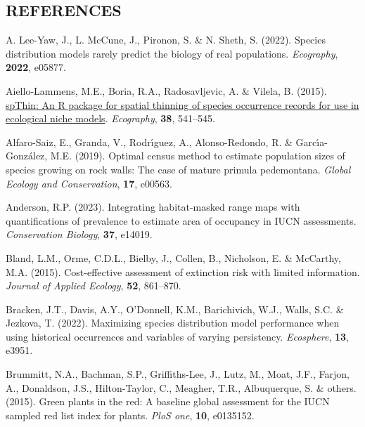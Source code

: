 \documentclass[
]{article}
\newlength{\cslhangindent}
\newlength{\cslentryspacingunit} %
\newenvironment{CSLReferences}[2] %
 {%
  \setlength{\parindent}{0pt}
  \ifodd #1
  \let\oldpar\par
  \def\par{\hangindent=\cslhangindent\oldpar}
  \fi
  \setlength{\parskip}{#2\cslentryspacingunit}
 }%
 {}
\begin{document}
\hypertarget{references}{%
\subsection*{REFERENCES}\label{references}}

\hypertarget{refs}{}
\begin{CSLReferences}{1}{0}
\leavevmode{}%
A. Lee-Yaw, J., L. McCune, J., Pironon, S. \& N. Sheth, S. (2022).
Species distribution models rarely predict the biology of real
populations. \emph{Ecography}, \textbf{2022}, e05877.

\leavevmode{}%
Aiello-Lammens, M.E., Boria, R.A., Radosavljevic, A. \& Vilela, B.
(2015).
\href{https://onlinelibrary.wiley.com/doi/10.1111/ecog.01132}{{spThin}:
An {R} package for spatial thinning of species occurrence records for
use in ecological niche models}. \emph{Ecography}, \textbf{38},
541--545.

\leavevmode{}%
Alfaro-Saiz, E., Granda, V., Rodrı́guez, A., Alonso-Redondo, R. \&
Garcı́a-González, M.E. (2019). Optimal census method to estimate
population sizes of species growing on rock walls: The case of mature
primula pedemontana. \emph{Global Ecology and Conservation},
\textbf{17}, e00563.

\leavevmode{}%
Anderson, R.P. (2023). Integrating habitat-masked range maps with
quantifications of prevalence to estimate area of occupancy in IUCN
assessments. \emph{Conservation Biology}, \textbf{37}, e14019.

\leavevmode{}%
Bland, L.M., Orme, C.D.L., Bielby, J., Collen, B., Nicholson, E. \&
McCarthy, M.A. (2015). Cost-effective assessment of extinction risk with
limited information. \emph{Journal of Applied Ecology}, \textbf{52},
861--870.

\leavevmode{}%
Bracken, J.T., Davis, A.Y., O'Donnell, K.M., Barichivich, W.J., Walls,
S.C. \& Jezkova, T. (2022). Maximizing species distribution model
performance when using historical occurrences and variables of varying
persistency. \emph{Ecosphere}, \textbf{13}, e3951.

\leavevmode{}%
Brummitt, N.A., Bachman, S.P., Griffiths-Lee, J., Lutz, M., Moat, J.F.,
Farjon, A., Donaldson, J.S., Hilton-Taylor, C., Meagher, T.R.,
Albuquerque, S. \& others. (2015). Green plants in the red: A baseline
global assessment for the IUCN sampled red list index for plants.
\emph{PloS one}, \textbf{10}, e0135152.


\end{CSLReferences}
\end{document}
